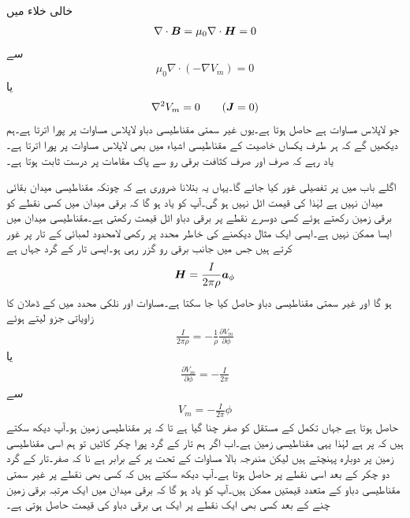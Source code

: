 خالی خلاء میں
\begin{align*}
\nabla \cdot {\ensuremath{{\boldsymbol{B}}}}=\mu_0 \nabla \cdot {\ensuremath{{\boldsymbol{H}}}}=0
\end{align*}
سے
\begin{align*}
\mu_0 \nabla \cdot \left(-\nabla V_m \right)=0
\end{align*}
یا
\begin{align}
\nabla^2 V_m=0 \quad \quad ({{\boldsymbol{J}}}=0)
\end{align}
جو لاپلاس مساوات ہے حاصل ہوتا ہے۔یوں غیر سمتی مقناطیسی دباو لاپلاس مساوات پر پورا اترتا ہے۔ہم دیکھیں گے کہ ہر طرف یکساں خاصیت کے مقناطیسی اشیاء میں بھی  لاپلاس مساوات پر پورا اترتا ہے۔یاد رہے کہ  صرف اور صرف کثافت برقی رو سے پاک مقامات پر درست ثابت ہوتا ہے۔

اگلے باب میں  پر تفصیلی غور کیا جائے گا۔یہاں یہ بتلانا ضروری ہے کہ چونکہ مقناطیسی میدان  بقائی میدان نہیں ہے لہٰذا  کی قیمت اٹل نہیں ہو گی۔آپ کو یاد ہو گا کہ برقی میدان میں کسی نقطے کو برقی زمین رکھتے ہوئے کسی دوسرے نقطے پر برقی دباو اٹل قیمت رکھتی ہے۔مقناطیسی میدان میں ایسا ممکن نہیں ہے۔ایسی ایک مثال دیکھنے کی خاطر  محدد پر رکھی لامحدود لمبائی کے تار پر غور کرتے ہیں جس میں  جانب  برقی رو گزر رہی ہو۔ایسی تار کے گرد جہاں  ہے
\begin{align*}
{\ensuremath{{\boldsymbol{H}}}}=\frac{I}{2\pi \rho} {\boldsymbol{a}}_{\phi}
\end{align*}
ہو گا اور غیر سمتی مقناطیسی دباو حاصل کیا جا سکتا ہے۔مساوات  اور نلکی محدد میں  کے ڈھلان کا زاویاتی جزو لیتے ہوئے
\begin{align*}
\frac{I}{2\pi \rho} =-\frac{1}{\rho} \frac{\partial V_m}{\partial \phi}
\end{align*}
یا
\begin{align*}
\frac{\partial V_m}{\partial \phi}=-\frac{I}{2\pi}
\end{align*}
سے
\begin{align*}
V_m=-\frac{I}{2\pi}\phi
\end{align*}
حاصل ہوتا ہے جہاں تکمل کے مستقل کو صفر چنا گیا ہے تا کہ  پر مقناطیسی زمین ہو۔آپ دیکھ سکتے ہیں کہ  پر  ہے لہٰذا یہی مقناطیسی زمین ہے۔اب اگر ہم تار کے گرد پورا چکر کاٹیں تو ہم اسی مقناطیسی زمین پر دوبارہ پہنچتے ہیں لیکن مندرجہ بالا مساوات کے تحت  پر  کے برابر ہے نا کہ صفر۔تار کے گرد دو چکر کے بعد اسی نقطے پر  حاصل ہوتا ہے۔آپ دیکھ سکتے ہیں کہ کسی بھی نقطے پر غیر سمتی مقناطیسی دباو کے متعدد قیمتیں ممکن ہیں۔آپ کو یاد ہو گا کہ برقی میدان میں ایک مرتبہ برقی زمین چنے کے بعد کسی بھی ایک نقطے پر ایک ہی برقی دباو کی قیمت حاصل ہوتی ہے۔

